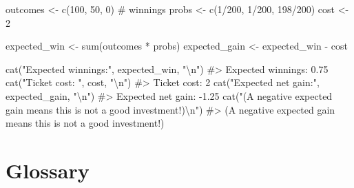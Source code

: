 \documentclass[
  11pt,
  a4paper,
  oneside,
  open=any]{scrbook}
\newenvironment{Shaded}{\begin{snugshade}}{\end{snugshade}}
\newcommand{\CommentTok}[1]{\textcolor[rgb]{0.37,0.37,0.37}{#1}}
\newcommand{\DecValTok}[1]{\textcolor[rgb]{0.68,0.00,0.00}{#1}}
\newcommand{\FunctionTok}[1]{\textcolor[rgb]{0.28,0.35,0.67}{#1}}
\newcommand{\NormalTok}[1]{\textcolor[rgb]{0.00,0.23,0.31}{#1}}
\newcommand{\OtherTok}[1]{\textcolor[rgb]{0.00,0.23,0.31}{#1}}
\newcommand{\SpecialCharTok}[1]{\textcolor[rgb]{0.37,0.37,0.37}{#1}}
\newcommand{\StringTok}[1]{\textcolor[rgb]{0.13,0.47,0.30}{#1}}
\begin{document}
\begin{Shaded}
\begin{Highlighting}[]
\NormalTok{outcomes  }\OtherTok{\textless{}{-}} \FunctionTok{c}\NormalTok{(}\DecValTok{100}\NormalTok{, }\DecValTok{50}\NormalTok{, }\DecValTok{0}\NormalTok{)         }\CommentTok{\# winnings}
\NormalTok{probs     }\OtherTok{\textless{}{-}} \FunctionTok{c}\NormalTok{(}\DecValTok{1}\SpecialCharTok{/}\DecValTok{200}\NormalTok{, }\DecValTok{1}\SpecialCharTok{/}\DecValTok{200}\NormalTok{, }\DecValTok{198}\SpecialCharTok{/}\DecValTok{200}\NormalTok{)}
\NormalTok{cost      }\OtherTok{\textless{}{-}} \DecValTok{2}

\NormalTok{expected\_win  }\OtherTok{\textless{}{-}} \FunctionTok{sum}\NormalTok{(outcomes }\SpecialCharTok{*}\NormalTok{ probs)}
\NormalTok{expected\_gain }\OtherTok{\textless{}{-}}\NormalTok{ expected\_win }\SpecialCharTok{{-}}\NormalTok{ cost}

\FunctionTok{cat}\NormalTok{(}\StringTok{"Expected winnings:"}\NormalTok{, expected\_win, }\StringTok{"}\SpecialCharTok{\textbackslash{}n}\StringTok{"}\NormalTok{)}
\CommentTok{\#\textgreater{} Expected winnings: 0.75}
\FunctionTok{cat}\NormalTok{(}\StringTok{"Ticket cost:      "}\NormalTok{, cost, }\StringTok{"}\SpecialCharTok{\textbackslash{}n}\StringTok{"}\NormalTok{)}
\CommentTok{\#\textgreater{} Ticket cost:       2}
\FunctionTok{cat}\NormalTok{(}\StringTok{"Expected net gain:"}\NormalTok{, expected\_gain, }\StringTok{"}\SpecialCharTok{\textbackslash{}n}\StringTok{"}\NormalTok{)}
\CommentTok{\#\textgreater{} Expected net gain: {-}1.25}
\FunctionTok{cat}\NormalTok{(}\StringTok{"(A negative expected gain means this is not a good investment!)}\SpecialCharTok{\textbackslash{}n}\StringTok{"}\NormalTok{)}
\CommentTok{\#\textgreater{} (A negative expected gain means this is not a good investment!)}
\end{Highlighting}
\end{Shaded}

\section{Glossary}\label{glossary-3}
\end{document}
